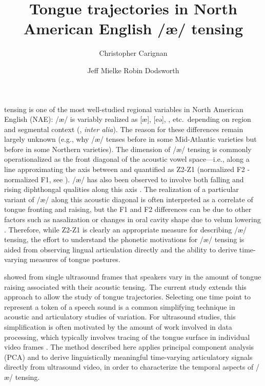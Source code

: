 \documentclass[output=paper]{LSP/langsci}
\author{Christopher Carignan\affiliation{North Carolina State University} \and Jeff Mielke\affiliation{North Carolina State University} \lastand Robin Dodsworth\affiliation{North Carolina State University}}
\title{Tongue trajectories in {N}orth {A}merican {E}nglish /æ/ tensing}
\begin{document}

 tensing is one of the most well-studied regional variables in North American English (NAE): /æ/ is variably realized as [æ], [eə], , etc.~depending on region and segmental context 
(\citealp{ash_distribution_2002,becker_short-system_2009,boberg_regional_2008,boberg_short-cincinnati:_2000,labov_atlas_2006-1,plichta_interdisciplinary_2005}, \textit{inter alia}). The reason for these differences remain largely unknown (e.g., why /æ/ tenses before  in some Mid-Atlantic varieties but before  in some Northern varieties). The dimension of /æ/ tensing is commonly operationalized as the front diagonal of the acoustic vowel space---i.e., along a line approximating the axis between  and  quantified as Z2-Z1 (normalized F2 - normalized F1, see \citealt{labov_one_2013}). /æ/ has also been observed to involve both falling and rising diphthongal qualities along this axis \citep{assmann_time-varying_2000,fox_cross-dialectal_2009,labov_atlas_2006-1}. The realization of a particular variant of /æ/ along this acoustic diagonal is often interpreted as a correlate of tongue fronting and raising, but the F1 and F2 differences can be due to other factors such as nasalization \citep{decker_are_2012} or changes in oral cavity shape due to velum lowering \citep{baker_more_2008}. Therefore, while Z2-Z1 is clearly an appropriate measure for describing /æ/ tensing, the effort to understand the phonetic motivations for /æ/ tensing is aided from observing lingual articulation directly and the ability to derive time-varying measures of tongue postures. 

\citet{decker_are_2012} showed from single ultrasound frames that speakers vary in the amount of tongue raising associated with their acoustic tensing. The current study extends this approach to allow the study of tongue trajectories. Selecting one time point to represent a token of a speech sound is a common simplifying technique in acoustic and articulatory studies of variation.  For ultrasound studies, this simplification is often motivated by the amount of work involved in data processing, which typically involves tracing of the tongue surface in individual video frames \citep{li_automatic_2005}.
The method described here applies principal component analysis (PCA) and  to derive linguistically meaningful time-varying articulatory signals directly from ultrasound video, in order to characterize the temporal aspects of /æ/ tensing.
\end{document}
